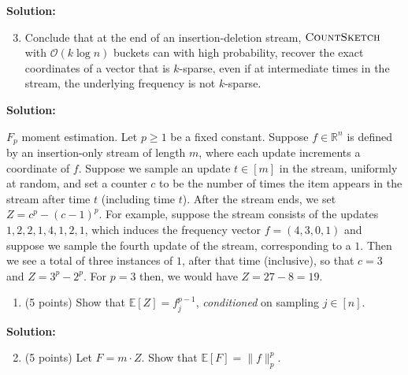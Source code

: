 \documentclass[11pt]{article}
\newcommand{\Ex}[1]{\ensuremath{\mathbb{E}\left[#1\right]}}
\newcommand{\CountSketch}{\textsc{CountSketch}}
\begin{document}
\noindent\textbf{Solution:}






\begin{enumerate}
\setcounter{enumi}{2}
\item
Conclude that at the end of an insertion-deletion stream, $\CountSketch$ with $\mathcal{O}(k\log n)$ buckets can with high probability, recover the exact coordinates of a vector that is $k$-sparse, even if at intermediate times in the stream, the underlying frequency is not $k$-sparse.
\end{enumerate}

\noindent\textbf{Solution:}














\newpage\noindent
$F_p$ moment estimation. 
\vskip 0.1in\noindent
Let $p\ge 1$ be a fixed constant. 
Suppose $f\in\mathbb{R}^n$ is defined by an insertion-only stream of length $m$, where each update increments a coordinate of $f$. 
Suppose we sample an update $t\in[m]$ in the stream, uniformly at random, and set a counter $c$ to be the number of times the item appears in the stream after time $t$ (including time $t$). 
After the stream ends, we set $Z=c^p-(c-1)^p$. 
\vskip 0.1in\noindent
For example, suppose the stream consists of the updates $1,2,2,1,4,1,2,1$, which induces the frequency vector $f=(4,3,0,1)$ and suppose we sample the fourth update of the stream, corresponding to a $1$. 
Then we see a total of three instances of $1$, after that time (inclusive), so that $c=3$ and $Z=3^p-2^p$. 
For $p=3$ then, we would have $Z=27-8=19$. 
\begin{enumerate}
\item (5 points)
Show that $\Ex{Z}=f_j^{p-1}$, \emph{conditioned} on sampling $j\in[n]$.
\end{enumerate}

\noindent\textbf{Solution:}


\begin{enumerate}
\setcounter{enumi}{1}
\item (5 points)
Let $F=m\cdot Z$. 
Show that $\Ex{F}=\|f\|_p^p$. 
\end{enumerate}
\end{document}
